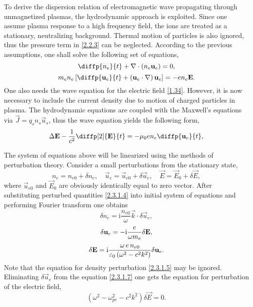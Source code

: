 To derive the dispersion relation of electromagnetic wave propagating through unmagnetized plasmas, the hydrodynamic approach is exploited. Since one assume plasma response to a high frequency field, the ions are treated as a stationary, neutralizing background. Thermal motion of particles is also ignored, thus the pressure term in \ref{2.2.3} can be neglected. According to the previous assumptions, one shall solve the following set of equations,
\begin{equation}
\label{2.3.1.1}
\diffp{n_e}{t} + \nabla \cdot \left(n_e \vec{u}_e \right) = 0,
\end{equation}
\begin{equation}
\label{2.3.1.2}
m_e n_e \left[ \diffp{\vec{u}_e}{t} + \left(\vec{u}_e \cdot \nabla \right) \vec{u}_e \right] = - e n_e \vec{E}.
\end{equation}
One also needs the wave equation for the electric field \ref{1.34}. However, it is now necessary to include the current density due to motion of charged particles in plasma. The hydrodynamic equations are coupled with the Maxwell's equations via $ \vec{J} = q_s n_s \vec{u}_s $, thus the wave equation yields the following form,
\begin{equation}
\label{2.3.1.3}
\laplace{\vec{E}} - \frac{1}{c^{2}} \diffp[2]{\vec{E}}{t} = - \mu_0 e n_e \diffp{\vec{u}_e}{t},
\end{equation}

The system of equations above will be linearized using the methods of perturbation theory. Consider a small perturbations from the stationary state,
\begin{equation}
\label{2.3.1.4}
n_{e} = n_{e0} + \delta n_{e}, \quad \vec{u}_{e} = \vec{u}_{e0} + \delta \vec{u}_{e}, \quad \vec{E} = \vec{E}_{0} + \delta \vec{E},
\end{equation}
where $ \vec{u}_{e0} $ and $ \vec{E}_{0} $ are obviously identically equal to zero vector. After substituting perturbed quantities \ref{2.3.1.4} into initial system of equations and performing Fourier transform one obtains
\begin{equation}
\label{2.3.1.5}
\delta n_{e} = \mathrm{i} \frac{n_{e0}}{\omega} \vec{k} \cdot \delta \vec{u}_{e},
\end{equation}
\begin{equation}
\label{2.3.1.6}
\delta \mathbf{u}_e = -\mathrm{i} \frac{e}{\omega m_e} \delta \mathbf{E},
\end{equation}
\begin{equation}
\label{2.3.1.7}
\delta \mathbf{E} = \mathrm{i} \frac{\omega \, e \, n_{e0}}{\varepsilon_0 \left(\omega^2 - c^2 k^2 \right)} \delta \mathbf{u}_e.
\end{equation}
Note that the equation for density perturbation \ref{2.3.1.5} may be ignored. Eliminating $ \delta \vec{u}_{e} $ from the equation \ref{2.3.1.7} one gets the equation for perturbation of the electric field,
\begin{equation}
\label{2.3.1.8}
\left(\omega^2 - \omega_{pe}^2 - c^2 k^2 \right) \delta \vec{E} = 0. 
\end{equation}

